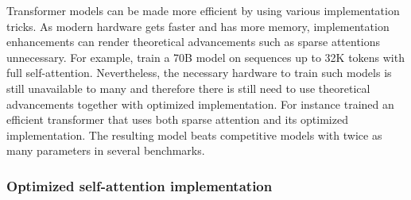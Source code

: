 









Transformer models can be made more efficient by using various implementation
tricks. As modern hardware gets faster and has more memory, implementation
enhancements can render theoretical advancements such as sparse attentions
unnecessary. For example, \cite{xiong2023effective} train a 70B model on
sequences up to 32K tokens with full self-attention. Nevertheless, the
necessary hardware to train such models is still unavailable to many and
therefore there is still need to use theoretical advancements together with
optimized implementation. For instance \cite{jiang2023mistral} trained an
efficient transformer that uses both sparse attention and its optimized
implementation. The resulting model beats competitive models with twice as many
parameters in several benchmarks.

\subsubsection{Optimized self-attention implementation}


